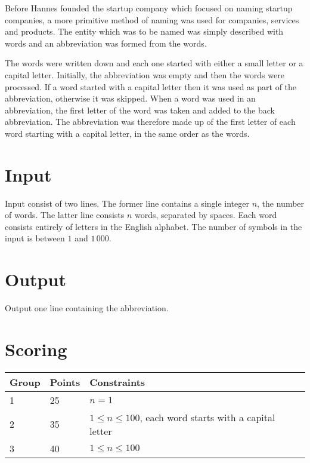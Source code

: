 
Before Hannes founded the startup company which focused on naming startup companies,
a more primitive method of naming was used for companies, services and products.
The entity which was to be named was simply described with words and an abbreviation was formed from the words.

The words were written down and each one started with either a small letter or a capital letter.
Initially, the abbreviation was empty and then the words were processed.
If a word started with a capital letter then it was used as part of the abbreviation, otherwise it was skipped.
When a word was used in an abbreviation, the first letter of the word was taken and added to the back abbreviation.
The abbreviation was therefore made up of the first letter of each word starting with a capital letter, in the same order as the words.

\section*{Input}
Input consist of two lines.
The former line contains a single integer $n$, the number of words.
The latter line consists $n$ words, separated by spaces.
Each word consists entirely of letters in the English alphabet.
The number of symbols in the input is between $1$ and $1\,000$.

\section*{Output}
Output one line containing the abbreviation.

\section*{Scoring}
\begin{tabular}{|l|l|l|}
\hline
Group & Points & Constraints \\ \hline
1     & 25     & $n = 1$ \\ \hline
2     & 35     & $1 \leq n \leq 100$, each word starts with a capital letter \\ \hline
3     & 40     & $1 \leq n \leq 100$ \\ \hline
\end{tabular}

